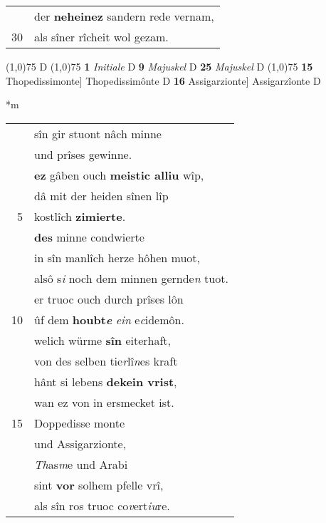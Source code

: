 \documentclass[8pt,a4paper,notitlepage]{article}
\begin{document}
\begin{table}[ht]
\begin{minipage}[t]{0.5\linewidth}
\begin{tabular}{rl}
 & der \textbf{neheinez} sandern rede vernam,\\ 
30 & als sîner rîcheit wol gezam.\\ 
\end{tabular}
\scriptsize
\line(1,0){75} \newline
D \newline
\line(1,0){75} \newline
\textbf{1} \textit{Initiale} D  \textbf{9} \textit{Majuskel} D  \textbf{25} \textit{Majuskel} D  \newline
\line(1,0){75} \newline
\textbf{15} Thopedissimonte] Thopedissimônte D \textbf{16} Assigarzionte] Assigarzîonte D \newline
\end{minipage}
\hspace{0.5cm}
\begin{minipage}[t]{0.5\linewidth}
\small
\begin{center}*m
\end{center}
\begin{tabular}{rl}
 & sîn gir stuont nâch minne\\ 
 & und prîses gewinne.\\ 
 & \textbf{ez} gâben ouch \textbf{meistic alliu} wîp,\\ 
 & dâ mit der heiden sînen lîp\\ 
5 & kostlîch \textbf{zimierte}.\\ 
 & \textbf{des} minne condwierte\\ 
 & in sîn manlîch herze hôhen muot,\\ 
 & alsô s\textit{i} noch dem minnen gernde\textit{n} tuot.\\ 
 & er truoc ouch durch prîses lôn\\ 
10 & ûf dem \textbf{houbt\textit{e}} \textit{ein} e\textit{c}idemôn.\\ 
 & welich würme \textbf{sîn} eiterhaft,\\ 
 & von des selben tie\textit{r}lî\textit{n}es kraft\\ 
 & hânt si lebens \textbf{dekein vrist},\\ 
 & wan ez von in ersmecket ist.\\ 
15 & Doppedisse monte\\ 
 & und Assigarzionte,\\ 
 & \textit{Th}as\textit{m}e und Arabi\\ 
 & sint \textbf{vor} solhem pfelle vrî,\\ 
 & als sîn ros truoc co\textit{v}ert\textit{iu}re.\\ 

\end{tabular}
\end{minipage}
\end{table}
\end{document}
